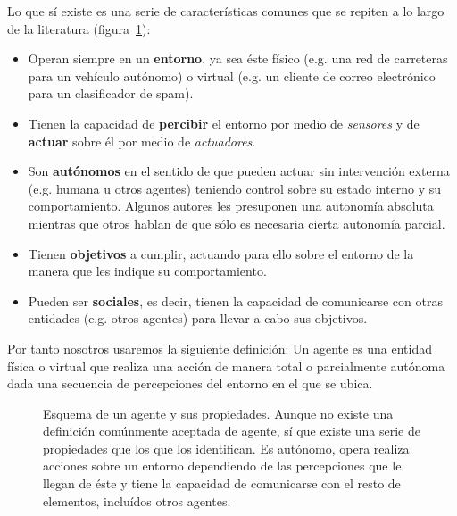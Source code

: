 Lo que sí existe es una serie de características comunes que se repiten a lo largo de la literatura (figura~\ref{fig:agent-properties}):

\begin{itemize}
	\item Operan siempre en un \textbf{entorno}, ya sea éste físico (e.g. una red de carreteras para un vehículo autónomo) o virtual (e.g. un cliente de correo electrónico para un clasificador de spam).
	\item Tienen la capacidad de \textbf{percibir} el entorno por medio de \textit{sensores} y de \textbf{actuar} sobre él por medio de \textit{actuadores}.
	\item Son \textbf{autónomos} en el sentido de que pueden actuar sin intervención externa (e.g. humana u otros agentes) teniendo control sobre su estado interno y su comportamiento. Algunos autores les presuponen una autonomía absoluta mientras que otros hablan de que sólo es necesaria cierta autonomía parcial.
	\item Tienen \textbf{objetivos} a cumplir, actuando para ello sobre el entorno de la manera que les indique su comportamiento.
	\item Pueden ser \textbf{sociales}, es decir, tienen la capacidad de comunicarse con otras entidades (e.g. otros agentes) para llevar a cabo sus objetivos.
\end{itemize}

Por tanto nosotros usaremos la siguiente definición: Un agente es una entidad física o virtual que realiza una acción de manera total o parcialmente autónoma dada una secuencia de percepciones del entorno en el que se ubica.

\begin{figure}
	\caption{Esquema de un agente y sus propiedades. Aunque no existe una definición comúnmente aceptada de agente, sí que existe una serie de propiedades que los que los identifican. Es autónomo, opera realiza acciones sobre un entorno dependiendo de las percepciones que le llegan de éste y tiene la capacidad de comunicarse con el resto de elementos, incluídos otros agentes.}
	\label{fig:agent-properties}
\end{figure}

